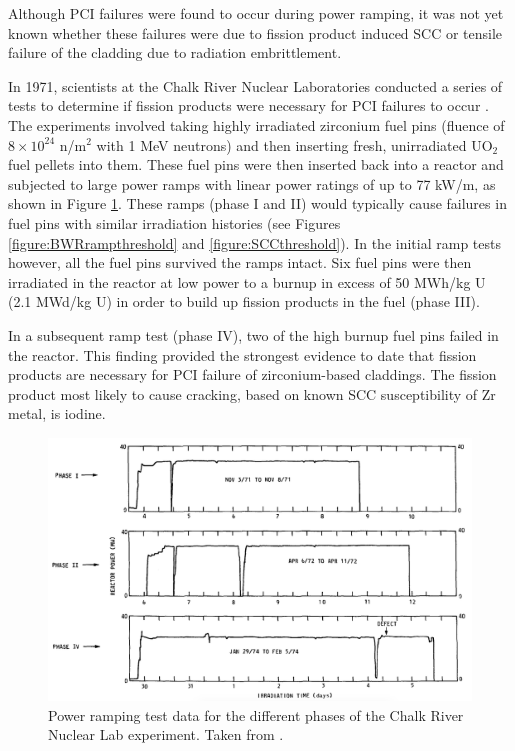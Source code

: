 Although PCI failures were found to occur during power ramping, it was not yet known whether these failures were due to fission product induced SCC or tensile failure of the cladding due to radiation embrittlement. 

In 1971, scientists at the Chalk River Nuclear Laboratories conducted a series of tests to determine if fission products were necessary for PCI failures to occur \cite{MacDonald1979}. The experiments involved taking highly irradiated zirconium fuel pins (fluence of $8 \times 10^{24}$ n/m$^{2}$ with 1 MeV neutrons) and then inserting fresh, unirradiated UO$_{2}$ fuel pellets into them. These fuel pins were then inserted back into a reactor and subjected to large power ramps with linear power ratings of up to 77 kW/m, as shown in Figure \ref{figure:fueltests}. These ramps (phase I and II) would typically cause failures in fuel pins with similar irradiation histories (see Figures \ref{figure:BWRrampthreshold} and \ref{figure:SCCthreshold}). In the initial ramp tests however, all the fuel pins survived the ramps intact. Six fuel pins were then irradiated in the reactor at low power to a burnup in excess of 50 MWh/kg U (2.1 MWd/kg U) in order to build up fission products in the fuel (phase III). 

In a subsequent ramp test (phase IV), two of the high burnup fuel pins failed in the reactor. This finding provided the strongest evidence to date that fission products are necessary for PCI failure of zirconium-based claddings. The fission product most likely to cause cracking, based on known SCC susceptibility of Zr metal, is iodine.

\begin{landscape} %
\begin{figure}[ht]
\centering
\includegraphics[width=\linewidth]{images/fueltests.png}
\caption[Power ramping test data for the different phases of the Chalk River Nuclear Lab experiment.]{Power ramping test data for the different phases of the Chalk River Nuclear Lab experiment. Taken from \cite{MacDonald1979}.}
\label{figure:fueltests}
\end{figure}
\end{landscape}


